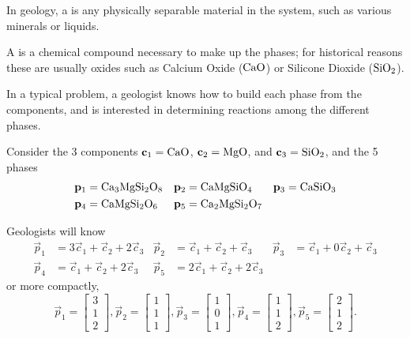
\begin{applicationActivities}

\begin{definition}
In geology, a  is any physically separable material in the system, such as various minerals or liquids.

\vspace{1em}

A  is a chemical compound necessary to make up the phases; for historical reasons these are usually oxides such as Calcium Oxide (${\rm CaO}$) or Silicone Dioxide (${\rm SiO_2}$).

\vspace{1em}

In a typical problem, a geologist knows how to build each phase from the components, and is interested in determining reactions among the different phases.
\end{definition}

\begin{activity}{5}
Consider the 3 components $\vec{c}_1={\rm CaO}$, $\vec{c}_2={\rm MgO}$, and $\vec{c}_3={\rm SiO_2}$, and the 5 phases
\begin{align*}
\vec{p}_1 &= {\rm Ca_3MgSi_2O_8} & \vec{p}_2 &= {\rm CaMgSiO_4} & \vec{p}_3 &= {\rm CaSiO_3} \\
\vec{p}_4 &= {\rm CaMgSi_2O_6} & \vec{p}_5 &= {\rm Ca_2MgSi_2O_7}
\end{align*}

Geologists will know
\begin{align*}
\vec{p}_1 &= 3\vec{c}_1 + \vec{c}_2 + 2 \vec{c}_3 & \vec{p}_2 &= \vec{c}_1 +\vec{c}_2 + \vec{c}_3  &
\vec{p}_3 &= \vec{c}_1 + 0\vec{c}_2 +  \vec{c}_3 \\
\vec{p}_4 &= \vec{c}_1 +\vec{c}_2 + 2\vec{c}_3 &  \vec{p}_5 &= 2\vec{c}_1 + \vec{c}_2 + 2 \vec{c}_3 
\end{align*}
or more compactly,
$$ \vec{p}_1 = \begin{bmatrix} 3 \\ 1 \\ 2 \end{bmatrix},
\vec{p}_2 = \begin{bmatrix} 1 \\ 1 \\ 1 \end{bmatrix},
\vec{p}_3 = \begin{bmatrix} 1 \\ 0 \\ 1 \end{bmatrix},
\vec{p}_4 = \begin{bmatrix} 1 \\ 1 \\ 2 \end{bmatrix},
\vec{p}_5 = \begin{bmatrix} 2 \\ 1 \\ 2 \end{bmatrix}.$$


\end{activity}
\end{applicationActivities}
